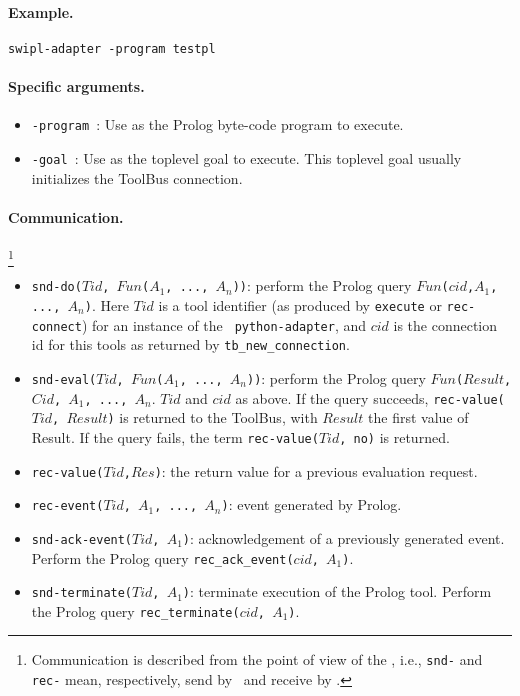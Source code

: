 \paragraph{Example.} {\tt swipl-adapter -program testpl}

\paragraph{Specific arguments.}
\begin{itemize}
\item {\tt -program }: Use  as the Prolog byte-code program
to execute.
\item {\tt -goal }: Use  as the toplevel goal to execute.
This toplevel goal usually initializes the ToolBus connection.
\end{itemize}

\paragraph{Communication.} \hspace{-0.3cm}\footnote{Communication is described
from the point of view of the \TB, i.e., {\tt snd-} and {\tt rec-}
mean, respectively, send by \TB\ and receive by \TB.}

\begin{itemize}
\item {\tt snd-do($Tid$, $Fun$($A_1$, ..., $A_n$))}: perform the Prolog
query
{\tt $Fun$($cid$,$A_1$, ..., $A_n$)}. Here $Tid$ is a tool identifier
(as produced by {\tt execute} or {\tt rec-connect}) for an instance of the {\tt
python-adapter}, and $cid$ is the connection id for this tools as returned
by {\tt tb\_new\_connection}.
\item {\tt snd-eval($Tid$, $Fun$($A_1$, ..., $A_n$))}: perform the Prolog
query
{\tt $Fun$($Result$,$Cid$, $A_1$, ..., $A_n$}. $Tid$ and $cid$ as above.
If the query succeeds, {\tt rec-value($Tid$, $Result$)} is returned
to the ToolBus, with $Result$ the first value of Result.
If the query fails, the term {\tt rec-value($Tid$, no)}
is returned.
\item {\tt rec-value($Tid$,$Res$)}: the return value for a previous evaluation request.
\item {\tt rec-event($Tid$, $A_1$, ..., $A_n$)}: event generated by Prolog.
\item {\tt snd-ack-event($Tid$, $A_1$)}: acknowledgement of
a previously generated event. Perform the Prolog query
{\tt rec\_ack\_event($cid$, $A_1$)}.
\item {\tt snd-terminate($Tid$, $A_1$)}: terminate execution of the
Prolog tool. Perform the Prolog query
{\tt rec\_terminate($cid$, $A_1$)}.
\end{itemize}


